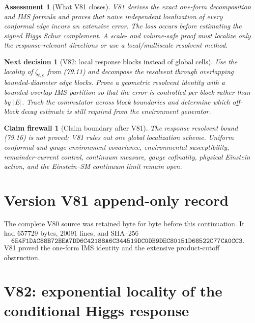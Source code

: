 \documentclass[11pt]{article}
\newtheorem{firewall}[theorem]{Claim firewall}
\newtheorem{decision}[theorem]{Next decision}
\newtheorem{assessment}[theorem]{Assessment}
\theoremstyle{remark}
\begin{document}
\begin{assessment}[What V81 closes]
\label{ass:v17v81-status}
V81 derives the exact one-form decomposition and IMS formula and proves
that naive independent localization of every conformal edge incurs an
extensive error.  The loss occurs before estimating the signed Higgs
Schur complement.  A scale- and volume-safe proof must localize only
the response-relevant directions or use a local/multiscale resolvent
method.
\end{assessment}

\begin{decision}[V82: local response blocks instead of global cells]
\label{dec:v17v81-next}
Use the locality of \(\zeta_{t,e}\) from (79.11) and decompose the
resolvent through overlapping bounded-diameter edge blocks.  Prove a
geometric resolvent identity with a bounded-overlap IMS partition so
that the error is controlled per block rather than by \(|E|\).  Track
the commutator across block boundaries and determine which off-block
decay estimate is still required from the environment generator.
\end{decision}

\begin{firewall}[Claim boundary after V81]
\label{fire:v17v81}
The response resolvent bound (79.16) is not proved; V81 rules out one
global localization scheme.  Uniform conformal and gauge environment
covariance, environmental susceptibility, remainder-current control,
continuum measure, gauge cofinality, physical Einstein action, and the
Einstein--SM continuum limit remain open.
\end{firewall}

\section*{Version V81 append-only record}
The complete V80 source was retained byte for byte before this
continuation.  It had \(657729\) bytes, \(20091\) lines, and SHA--256
\[
 \texttt{6E4F1DAC88B72BEA7DD6C42188A6C344519DC0DB9DEC80151D68522C77CA0CC3}.
\]
V81 proved the one-form IMS identity and the extensive product-cutoff
obstruction.


\section{V82: exponential locality of the conditional Higgs response}
\label{sec:v17v82}
\end{document}
